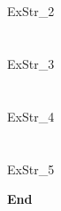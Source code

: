 \documentclass[a4paper, leqno, 12pt]{article} %
\newenvironment{top_enumerate}{
\begin{enumerate}
  \setlength{\itemsep}{2em}
  \setlength{\topsep}{-0pt}
  \setlength{\partopsep}{-0pt}
}{\end{enumerate}}
\begin{document}
\bigskip
\section*{}

\begin{top_enumerate}

ExStr_2

\end{top_enumerate}

\bigskip
\section*{}

\begin{top_enumerate}

ExStr_3

\end{top_enumerate}

\bigskip
\section*{}

\begin{top_enumerate}

ExStr_4

\end{top_enumerate}

\bigskip
\section*{}

\begin{top_enumerate}

ExStr_5

\end{top_enumerate}

\rfoot{}                %
\begin{flushright}      %
\textbf{End}
\end{flushright}
\end{document}
